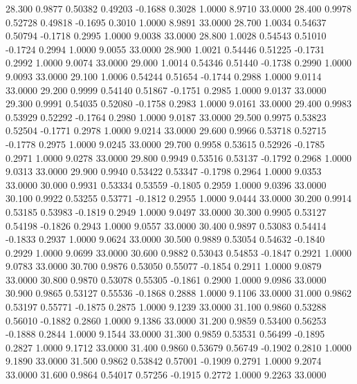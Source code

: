   28.300   0.9877   0.50382   0.49203  -0.1688   0.3028   1.0000   8.9710  33.0000
  28.400   0.9978   0.52728   0.49818  -0.1695   0.3010   1.0000   8.9891  33.0000
  28.700   1.0034   0.54637   0.50794  -0.1718   0.2995   1.0000   9.0038  33.0000
  28.800   1.0028   0.54543   0.51010  -0.1724   0.2994   1.0000   9.0055  33.0000
  28.900   1.0021   0.54446   0.51225  -0.1731   0.2992   1.0000   9.0074  33.0000
  29.000   1.0014   0.54346   0.51440  -0.1738   0.2990   1.0000   9.0093  33.0000
  29.100   1.0006   0.54244   0.51654  -0.1744   0.2988   1.0000   9.0114  33.0000
  29.200   0.9999   0.54140   0.51867  -0.1751   0.2985   1.0000   9.0137  33.0000
  29.300   0.9991   0.54035   0.52080  -0.1758   0.2983   1.0000   9.0161  33.0000
  29.400   0.9983   0.53929   0.52292  -0.1764   0.2980   1.0000   9.0187  33.0000
  29.500   0.9975   0.53823   0.52504  -0.1771   0.2978   1.0000   9.0214  33.0000
  29.600   0.9966   0.53718   0.52715  -0.1778   0.2975   1.0000   9.0245  33.0000
  29.700   0.9958   0.53615   0.52926  -0.1785   0.2971   1.0000   9.0278  33.0000
  29.800   0.9949   0.53516   0.53137  -0.1792   0.2968   1.0000   9.0313  33.0000
  29.900   0.9940   0.53422   0.53347  -0.1798   0.2964   1.0000   9.0353  33.0000
  30.000   0.9931   0.53334   0.53559  -0.1805   0.2959   1.0000   9.0396  33.0000
  30.100   0.9922   0.53255   0.53771  -0.1812   0.2955   1.0000   9.0444  33.0000
  30.200   0.9914   0.53185   0.53983  -0.1819   0.2949   1.0000   9.0497  33.0000
  30.300   0.9905   0.53127   0.54198  -0.1826   0.2943   1.0000   9.0557  33.0000
  30.400   0.9897   0.53083   0.54414  -0.1833   0.2937   1.0000   9.0624  33.0000
  30.500   0.9889   0.53054   0.54632  -0.1840   0.2929   1.0000   9.0699  33.0000
  30.600   0.9882   0.53043   0.54853  -0.1847   0.2921   1.0000   9.0783  33.0000
  30.700   0.9876   0.53050   0.55077  -0.1854   0.2911   1.0000   9.0879  33.0000
  30.800   0.9870   0.53078   0.55305  -0.1861   0.2900   1.0000   9.0986  33.0000
  30.900   0.9865   0.53127   0.55536  -0.1868   0.2888   1.0000   9.1106  33.0000
  31.000   0.9862   0.53197   0.55771  -0.1875   0.2875   1.0000   9.1239  33.0000
  31.100   0.9860   0.53288   0.56010  -0.1882   0.2860   1.0000   9.1386  33.0000
  31.200   0.9859   0.53400   0.56253  -0.1888   0.2844   1.0000   9.1544  33.0000
  31.300   0.9859   0.53531   0.56499  -0.1895   0.2827   1.0000   9.1712  33.0000
  31.400   0.9860   0.53679   0.56749  -0.1902   0.2810   1.0000   9.1890  33.0000
  31.500   0.9862   0.53842   0.57001  -0.1909   0.2791   1.0000   9.2074  33.0000
  31.600   0.9864   0.54017   0.57256  -0.1915   0.2772   1.0000   9.2263  33.0000
